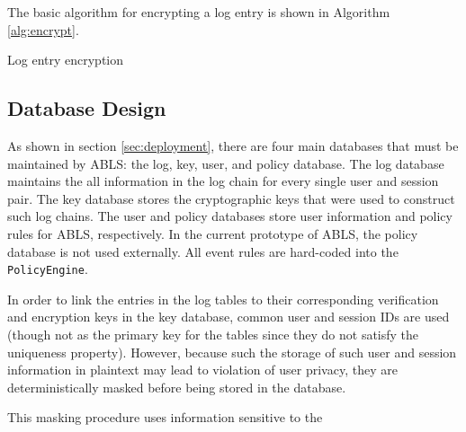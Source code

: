 \documentclass{sig-alternate}
\begin{document}
The basic algorithm for encrypting a log entry is shown in Algorithm \ref{alg:encrypt}.

\begin{algorithm}[ht!] %
\caption{Log entry encryption} \label{alg:encrypt}
\begin{algorithmic}[1]

\ENDIF
{}
\end{algorithmic}
\end{algorithm}

\subsection{Database Design}
As shown in section \ref{sec:deployment}, there are four main databases that must be maintained by ABLS:
the log, key, user, and policy database. The log database maintains the all information in the log chain for every 
single user and session pair. The key database stores the cryptographic keys that were used to construct
such log chains. The user and policy databases store user information and policy rules for ABLS, respectively. 
In the current prototype of ABLS, the policy database is not used externally. All event rules are hard-coded into
the {\tt PolicyEngine}. 

In order to link the entries in the log tables to their corresponding verification and encryption keys in the key database,
common user and session IDs are used (though not as the primary key for the tables since they do not satisfy
the uniqueness property). However, because such the storage of such user and session information in plaintext
may lead to violation of user privacy, they are deterministically masked before being stored in the database. 

This masking procedure uses information sensitive to the 
\end{document}
